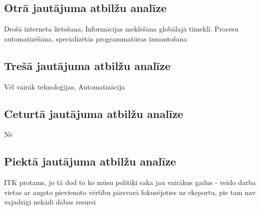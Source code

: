 \subsection{Otrā jautājuma atbilžu analīze}
Drošā interneta lietošana, Informācijas meklēšana globālajā tīmeklī. Procesu automatizēšana, specializētās
programmatūras izmantošana
\subsection{Trešā jautājuma atbilžu analīze}
Vēl vairāk tehnoloģijas,
Automatizācija
\subsection{Ceturtā jautājuma atbilžu analīze}
Nē 
\subsection{Piektā jautājuma atbilžu analīze}
ITK protams, jo tā dod to ko mūsu politiķi saka jau vairākus gadus - veido darba vietas ar augsto pievienoto vērtību
pārsvarā fokusējoties uz eksportu, pie tam nav vajadzīgi nekādi dabas resursi